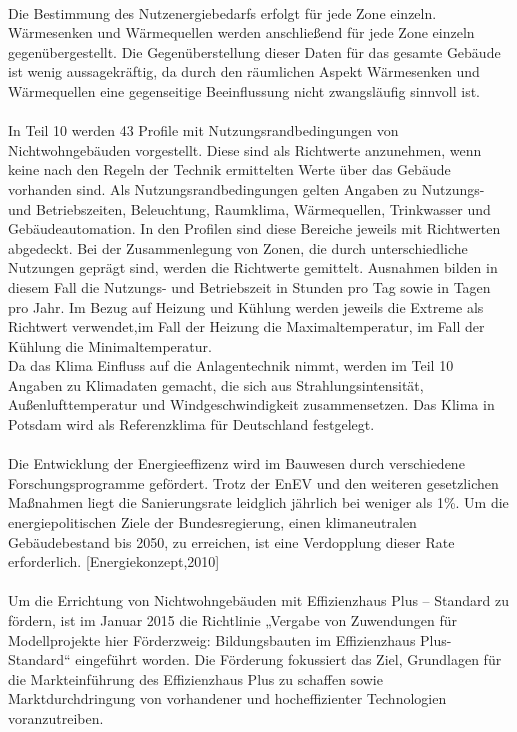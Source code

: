 \\
Die Bestimmung des Nutzenergiebedarfs erfolgt für jede Zone einzeln. Wärmesenken und Wärmequellen werden anschließend für jede Zone einzeln gegenübergestellt. Die Gegenüberstellung dieser Daten für das gesamte Gebäude ist wenig aussagekräftig, da durch den räumlichen Aspekt Wärmesenken und Wärmequellen eine gegenseitige Beeinflussung nicht zwangsläufig sinnvoll ist.\\
\\
In Teil 10 werden 43 Profile mit Nutzungsrandbedingungen von Nichtwohngebäuden vorgestellt. Diese sind als Richtwerte anzunehmen, wenn keine nach den Regeln der Technik ermittelten Werte über das Gebäude vorhanden sind. Als Nutzungsrandbedingungen gelten Angaben zu Nutzungs- und Betriebszeiten, Beleuchtung, Raumklima, Wärmequellen, Trinkwasser und Gebäudeautomation. In den Profilen sind diese Bereiche jeweils mit Richtwerten abgedeckt. 
Bei der Zusammenlegung von Zonen, die durch unterschiedliche Nutzungen geprägt sind, werden die Richtwerte gemittelt. Ausnahmen bilden in diesem Fall die Nutzungs- und Betriebszeit in Stunden pro Tag sowie in Tagen pro Jahr. Im Bezug auf Heizung und Kühlung werden jeweils die Extreme als Richtwert verwendet,im Fall der Heizung die Maximaltemperatur, im Fall der Kühlung die Minimaltemperatur.  \\
Da das Klima Einfluss auf die Anlagentechnik nimmt, werden im Teil 10 Angaben zu Klimadaten gemacht, die sich aus Strahlungsintensität, Außenlufttemperatur und Windgeschwindigkeit zusammensetzen. Das Klima in Potsdam wird als Referenzklima für Deutschland festgelegt.\\
\\
Die Entwicklung der Energieeffizenz wird im Bauwesen durch verschiedene Forschungsprogramme gefördert. Trotz der EnEV und den weiteren gesetzlichen Maßnahmen liegt die Sanierungsrate leidglich jährlich bei weniger als 1\%. Um die energiepolitischen Ziele der Bundesregierung, einen klimaneutralen Gebäudebestand bis 2050, zu erreichen, ist eine Verdopplung dieser Rate erforderlich.  [Energiekonzept,2010] \\
\\
Um die Errichtung von Nichtwohngebäuden mit Effizienzhaus Plus – Standard zu fördern, ist im Januar 2015 die Richtlinie „Vergabe von Zuwendungen für Modellprojekte hier Förderzweig: Bildungsbauten im Effizienzhaus Plus-Standard“ eingeführt worden. Die Förderung fokussiert das Ziel, Grundlagen für die Markteinführung des Effizienzhaus Plus zu schaffen sowie Marktdurchdringung von vorhandener und hocheffizienter Technologien voranzutreiben. \\
